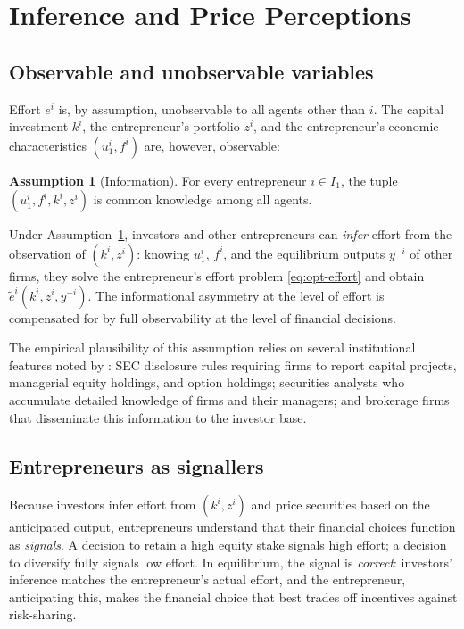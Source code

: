 \documentclass[11pt,a4paper,oneside]{book}
\theoremstyle{plain}
\theoremstyle{definition}
\newtheorem{assumption}[theorem]{Assumption}
\theoremstyle{remark}
\numberwithin{equation}{chapter}
\begin{document}
\section{Inference and Price Perceptions}
\label{sec:MH-inference}

\subsection{Observable and unobservable variables}

Effort $e^i$ is, by assumption, unobservable to all agents other than $i$.
The capital investment $k^i$, the entrepreneur's portfolio $z^i$, and the entrepreneur's economic characteristics $(u^i_1, f^i)$ are, however, observable:

\begin{assumption}[Information]\label{ass:MH-info}
For every entrepreneur $i \in I_1$, the tuple $(u^i_1, f^i, k^i, z^i)$ is common knowledge among all agents.
\end{assumption}

Under Assumption~\ref{ass:MH-info}, investors and other entrepreneurs can \emph{infer} effort from the observation of $(k^i, z^i)$: knowing $u^i_1$, $f^i$, and the equilibrium outputs $y^{-i}$ of other firms, they solve the entrepreneur's effort problem \eqref{eq:opt-effort} and obtain $\widetilde{e}^i(k^i, z^i, y^{-i})$.
The informational asymmetry at the level of effort is compensated for by full observability at the level of financial decisions.

The empirical plausibility of this assumption relies on several institutional features noted by \citet{MagillQuinzii2002}: SEC disclosure rules requiring firms to report capital projects, managerial equity holdings, and option holdings; securities analysts who accumulate detailed knowledge of firms and their managers; and brokerage firms that disseminate this information to the investor base.

\subsection{Entrepreneurs as signallers}

Because investors infer effort from $(k^i, z^i)$ and price securities based on the anticipated output, entrepreneurs understand that their financial choices function as \emph{signals}.
A decision to retain a high equity stake signals high effort; a decision to diversify fully signals low effort.
In equilibrium, the signal is \emph{correct}: investors' inference matches the entrepreneur's actual effort, and the entrepreneur, anticipating this, makes the financial choice that best trades off incentives against risk-sharing.
\end{document}
